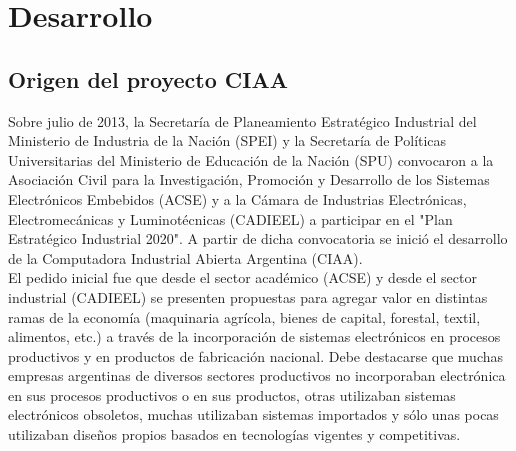 \documentclass[12pt,letterpaper]{article}
\begin{document}


\section{Desarrollo}

\subsection{Origen del proyecto CIAA}
Sobre julio de 2013, la Secretaría de Planeamiento Estratégico Industrial del Ministerio de Industria de la Nación (SPEI) y la Secretaría de Políticas Universitarias del Ministerio de Educación de la Nación (SPU) convocaron a la Asociación Civil para la Investigación, Promoción y Desarrollo de los Sistemas Electrónicos Embebidos (ACSE) y a la Cámara de Industrias Electrónicas, Electromecánicas y Luminotécnicas (CADIEEL) a participar en el "Plan Estratégico Industrial 2020". A partir de dicha convocatoria se inició el desarrollo de la Computadora Industrial Abierta Argentina (CIAA).\\

El pedido inicial fue que desde el sector académico (ACSE) y desde el sector industrial (CADIEEL) se presenten propuestas para agregar valor en distintas ramas de la economía (maquinaria agrícola, bienes de capital, forestal, textil, alimentos, etc.) a través de la incorporación de sistemas electrónicos en procesos productivos y en productos de fabricación nacional. Debe destacarse que muchas empresas argentinas de diversos sectores productivos no incorporaban electrónica en sus procesos productivos o en sus productos, otras utilizaban sistemas electrónicos obsoletos, muchas utilizaban sistemas importados y sólo unas pocas utilizaban diseños propios basados en tecnologías vigentes y competitivas.\\
\end{document}

